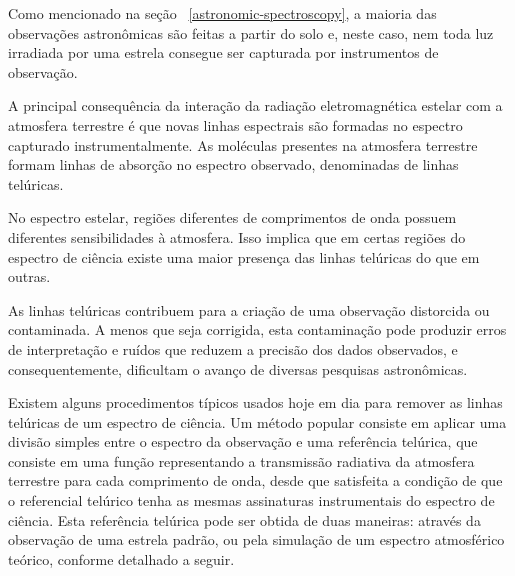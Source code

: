 Como mencionado na seção ~\ref{astronomic-spectroscopy}, a maioria das observações astronômicas são feitas a partir do solo e, neste caso, nem toda luz irradiada por uma estrela consegue ser capturada por instrumentos de observação. 

A principal consequência da interação da radiação eletromagnética estelar com a atmosfera terrestre é que novas linhas espectrais são formadas no espectro capturado instrumentalmente. As moléculas presentes na atmosfera terrestre formam linhas de absorção no espectro observado, denominadas de linhas telúricas.  

No espectro estelar, regiões diferentes de comprimentos de onda possuem diferentes sensibilidades à atmosfera. Isso implica que em certas regiões do espectro de ciência existe uma maior presença das linhas telúricas do que em outras.




As linhas telúricas  contribuem para a criação de uma observação distorcida ou contaminada. A menos que seja corrigida, esta contaminação pode produzir erros de interpretação e ruídos que reduzem a precisão dos dados observados, e consequentemente, dificultam o avanço de diversas pesquisas astronômicas.

Existem alguns procedimentos típicos usados hoje em dia para remover as linhas telúricas de um espectro de ciência. Um método popular consiste em aplicar uma divisão simples entre o espectro da observação e uma referência telúrica, que consiste em uma função representando a transmissão radiativa da atmosfera terrestre para cada comprimento de onda, desde que satisfeita a condição de que o referencial telúrico tenha as mesmas assinaturas instrumentais do espectro de ciência. Esta referência telúrica pode ser obtida de duas maneiras: através da observação de uma estrela padrão, ou pela simulação de um espectro atmosférico teórico, conforme detalhado a seguir.

